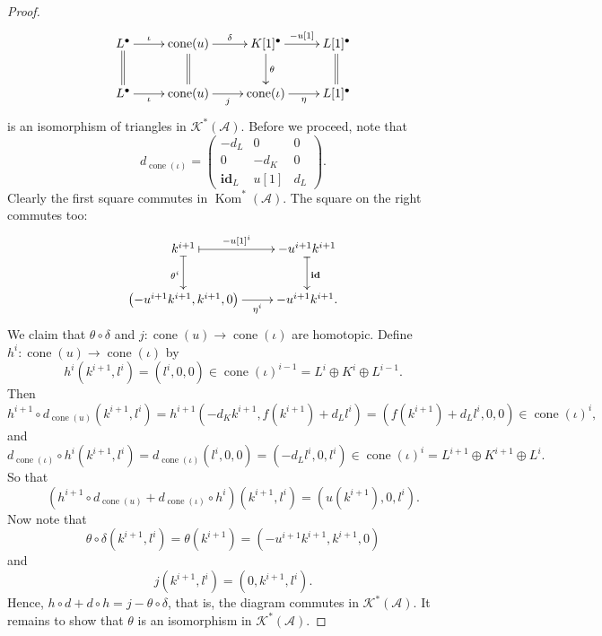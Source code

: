 \documentclass[11pt]{article}
\theoremstyle{thmstyle}
\theoremstyle{defstyle}
\newcommand{\id}{\mathbf{id}}
\newcommand{\scrA}{\mathscr{A}}
\newcommand{\Kom}{\operatorname{Kom}}
\newcommand{\scrK}{\mathscr{K}}
\newcommand{\cone}{\operatorname{cone}}
\begin{document}
\begin{proof}
\begin{equation*}
		\xymatrix {
			L^\bullet\ar[r]^-{\iota}\ar@{=}[d] & \cone(u)\ar[r]^-\delta\ar@{=}[d] & K[1]^\bullet\ar[r]^-{-u[1]}\ar[d]^\theta & L[1]^\bullet\ar@{=}[d]\\
			L^\bullet\ar[r]_-{\iota} & \cone(u)\ar[r]_-j & \cone(\iota)\ar[r]_-{\eta} & L[1]^\bullet
		}
	\end{equation*}
	is an isomorphism of triangles in $\scrK^\ast(\scrA)$. Before we proceed, note that 
	\begin{equation*}
		d_{\cone(\iota)} = 
		\begin{pmatrix}
			-d_L & 0 & 0\\
			0 & -d_K & 0\\
			\id_L & u[1] & d_L
		\end{pmatrix}.
	\end{equation*}
	Clearly the first square commutes in $\Kom^\ast(\scrA)$. The square on the right commutes too: 
	\begin{equation*}
		\xymatrix {
			k^{i + 1}\ar@{|->}[r]^-{-u[1]^i}\ar@{|->}[d]_{\theta^i} & -u^{i + 1}k^{i + 1}\ar@{|->}[d]^{\id}\\
			\left(-u^{i + 1}k^{i + 1}, k^{i + 1}, 0\right)\ar[r]_-{\eta^i} & -u^{i + 1}k^{i + 1}.
		}
	\end{equation*}
	We claim that $\theta\circ\delta$ and $j\colon\cone(u)\to\cone(\iota)$ are homotopic. Define $h^i\colon\cone(u)\to\cone(\iota)$ by 
	\begin{equation*}
		h^i\left(k^{i + 1}, l^i\right) = \left(l^i, 0, 0\right)\in \cone(\iota)^{i - 1} = L^i\oplus K^i\oplus L^{i - 1}.
	\end{equation*}
	Then 
	\begin{equation*}
		h^{i + 1}\circ d_{\cone(u)}\left(k^{i + 1}, l^i\right) = h^{i + 1}\left(-d_K k^{i + 1}, f(k^{i + 1}) + d_L l^i\right) = \left(f(k^{i + 1}) + d_Ll^i, 0, 0\right)\in\cone(\iota)^i,
	\end{equation*}
	and 
	\begin{equation*}
		d_{\cone(\iota)}\circ h^i\left(k^{i + 1}, l^i\right) = d_{\cone(\iota)}\left(l^i, 0, 0\right) = \left(-d_Ll^i, 0, l^i\right)\in\cone(\iota)^i = L^{i + 1}\oplus K^{i + 1}\oplus L^i.
	\end{equation*}
	So that 
	\begin{equation*}
		\left(h^{i + 1}\circ d_{\cone(u)} + d_{\cone(\iota)}\circ h^i\right)\left(k^{i + 1}, l^i\right) = \left(u(k^{i + 1}), 0, l^i\right).
	\end{equation*}
	Now note that 
	\begin{equation*}
		\theta\circ\delta\left(k^{i + 1}, l^i\right) = \theta\left(k^{i + 1}\right) = \left(-u^{i + 1}k^{i + 1}, k^{i + 1}, 0\right)
	\end{equation*}
	and 
	\begin{equation*}
		j\left(k^{i + 1}, l^i\right) = \left(0, k^{i + 1}, l^i\right).
	\end{equation*}
	Hence, $h\circ d + d\circ h = j - \theta\circ\delta$, that is, the diagram commutes in $\scrK^\ast(\scrA)$. It remains to show that $\theta$ is an isomorphism in $\scrK^\ast(\scrA)$. 


\end{proof}
\end{document}
